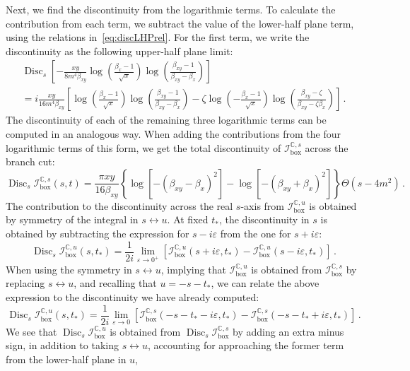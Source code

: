 \documentclass[12pt]{article}
\numberwithin{figure}{section}
\DeclareMathOperator{\Disc}{Disc}
\def \be {\begin{equation}}
\def \ee {\end{equation}}
\def \C {\mathbb{C}}
\def \I {\mathcal{I}}
\def \boxx {\mathrm{box}}
\begin{document}
	Next, we find the discontinuity from the logarithmic terms. To calculate the contribution from each term, we subtract the value of the lower-half plane term, using the relations in~\eqref{eq:discLHPrel}. For the first term, we write the discontinuity as the following upper-half plane limit:
	\begin{multline} 
	    \Disc_s \left[ - 
        \frac{x y}{8 m^4 \beta_{xy}}
        \log \left(\frac{\beta_x-1}{\sqrt{x}} \right)
        \log\left( \frac{\beta_{xy}-1}{\beta_{xy}-\beta_x} \right) \right]
	    \\ =
	    i \frac{x y}{16 m^4 \beta_{xy}} \left[\log \left(\frac{\beta_x-1}{\sqrt{x}} \right) \log\left( \frac{\beta_{xy}-1}{\beta_{xy}-\beta_x} \right)
	    -
	    \zeta
	    \log \left(-\frac{\beta_x-1}{\sqrt{x}}\right) \log\left( \frac{\beta_{xy}-\zeta}{\beta_{xy}-\zeta \beta_x} \right)
	    \right] \,.
	\end{multline} 
	The discontinuity of each of the remaining three logarithmic terms can be computed in an analogous way. When adding the contributions from the four logarithmic terms of this form, we get the total discontinuity of $\I_\boxx^{\C,s}$ across the branch cut:
	\be\label{eq:box-Disc-s}
	    \Disc_s \I_\boxx^{\C,s} (s,t) =  \frac{\pi x y}{16 \beta_{xy}}  \left\{
	    \log\left[- ( \beta_{xy}-\beta_x)^2 \right]
	    -
	    \log\left[- ( \beta_{xy}+\beta_x)^2 \right]
	    \right\} \Theta(s-4m^2)  \,.
	\ee 
	The contribution to the discontinuity across the real $s$-axis from $\I_\boxx^{\C,u}$ is obtained by symmetry of the integral in $s \leftrightarrow u$. At fixed $t_\ast$, the discontinuity in $s$ is obtained by subtracting the expression for $s-i \varepsilon$ from the one for $s+i\varepsilon$:
	\be 
	    \Disc_s \I_\boxx^{\C,u}(s,t_\ast) = \frac{1}{2 i} \lim_{\varepsilon \to 0^+} \left[ \I^{\C,u}_\boxx(s+i \varepsilon,t_\ast) - \I^{\C,u}_\boxx(s-i \varepsilon,t_\ast) \right] \,.
	\ee 
	When using the symmetry in $s \leftrightarrow u$, implying that $\I_\boxx^{\C,u}$ is obtained from $\I_\boxx^{\C,s}$ by replacing $s \leftrightarrow u$, and recalling that $u=-s-t_\ast$, we can relate the above expression to the discontinuity we have already computed:
	\be 
	    \Disc_s \I_\boxx^{\C,u} (s,t_\ast) = \frac{1}{2 i} \lim_{\varepsilon \to 0} \left[ \I_\boxx^{\C,s}(-s{-}t_\ast-i \varepsilon,t_\ast) - \I_\boxx^{\C,s}(-s{-}t_\ast+i \varepsilon,t_\ast) \right] \,.
	\ee 
	We see that $\Disc_s \I_\boxx^{\C,u}$ is obtained from $\Disc_s \I_\boxx^{\C,s}$ by adding an extra minus sign, in addition to taking $ s\leftrightarrow u$, accounting for approaching the former term from the lower-half plane in $u$,
\end{document}
